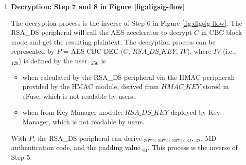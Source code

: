 \documentclass[main\_\_EN.tex]{subfiles}
\begin{document}
\begin{enumerate}

    \item {\bfseries Decryption: Step 7 and 8 in Figure \ref{fig:digsig-flow}}


        The decryption process is the inverse of Step 6 in Figure \ref{fig:digsig-flow}. The RSA\_DS peripheral will call the AES accelerator to decrypt \begin{math}C\end{math} in CBC block mode and get the resulting plaintext. The decryption process can be represented by \begin{math}P\end{math} = AES-CBC-DEC (\begin{math}C\end{math}, \begin{math}RSA\_DS\_KEY\end{math}, \begin{math}IV\end{math}), where \begin{math}IV\end{math} (i.e., \begin{math}[IV]_{128}\end{math}) is defined by the user. \begin{math}[RSA\_DS\_KEY]_{256}\end{math} is
        \begin{itemize}
            \item when calculated by the RSA\_DS peripheral via the HMAC peripheral: provided by the HMAC module, derived from \begin{math}HMAC\_KEY\end{math} stored in eFuse, which is not readable by users.
            \item when from Key Manager module:  \begin{math}RSA\_DS\_KEY\end{math} deployed by Key Manager, which is not readable by users.
        \end{itemize}

        With \begin{math}P\end{math}, the RSA\_DS peripheral can derive \begin{math}[Y]_{3072}\end{math}, \begin{math}[M]_{3072}\end{math}, \begin{math}[\overline{r}]_{3072}\end{math}, \begin{math}[M^{\prime}]_{32}\end{math}, \begin{math}[L]_{32}\end{math}, MD authentication code, and the padding value \begin{math}[\beta]_{64} \end{math}. This process is the inverse of Step 5.


\end{enumerate}
\end{document}
